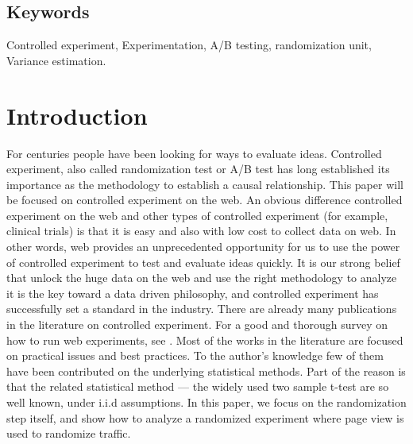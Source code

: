 \documentclass[11pt]{asaproc}
\newcommand{\ci}{\citeasnoun}
\begin{document}
\subsection*{Keywords}
Controlled experiment, Experimentation, A/B testing, randomization unit, Variance estimation. 


\section{Introduction}\label{intro}
For centuries people have been looking for ways to evaluate ideas. Controlled experiment, also called randomization test or A/B test has long established its importance as the methodology to establish a causal relationship. This paper will be focused on controlled experiment on the web. An obvious difference controlled experiment on the web and other types of controlled experiment (for example, clinical trials) is that it is easy and also with low cost to collect data on web. In other words, web provides an unprecedented opportunity for us to use the power of controlled experiment to test and evaluate ideas quickly. It is our strong belief that unlock the huge data on the web and use the right methodology to analyze it is the key toward a data driven philosophy, and controlled experiment has successfully set a standard in the industry.  There are already many publications in the literature on controlled experiment. For a good and thorough survey on how to run web experiments, see \ci{expsurvey}.  Most of the works in the literature are focused on practical issues and best practices. To the author's knowledge few of them have been contributed on the underlying statistical methods. Part of the reason is that the related statistical method --- the widely used two sample t-test are so well known, under i.i.d assumptions. In this paper, we focus on the randomization step itself, and show how to analyze a randomized experiment where page view is used to randomize traffic. 
\end{document}

